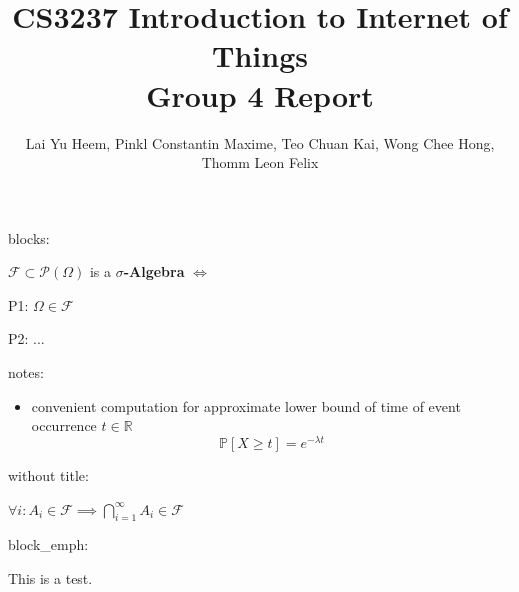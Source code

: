 \documentclass{article}
\begin{document}


blocks:

\begin{_block}

$\mathcal{F}\subset\mathcal{P}(\Omega)$ is a \textbf{$\sigma$-Algebra}
$\iff$

P1: $\Omega\in\mathcal{F}$

P2: ...

\end{_block}

notes:

\begin{_note}[Properties]
\begin{itemize}
\item convenient computation for approximate lower bound of time of event occurrence $t\in\mathbb{R}$
\[
\mathbb{P}[X\geq t]=e^{-\lambda t}
\]
\end{itemize}
\end{_note}

without title:

\begin{_note}[]

$\forall i:A_{i}\in\mathcal{F}\implies\bigcap_{i=1}^{\infty}A_{i}\in\mathcal{F}$

\end{_note}

block\_emph:

\begin{_block_emph}
This is a test.
\end{_block_emph}

\title{CS3237 Introduction to Internet of Things \\ Group 4 Report}
\author{Lai Yu Heem, Pinkl Constantin Maxime, Teo Chuan Kai, Wong Chee Hong, Thomm Leon Felix}
\maketitle

\renewcommand\thesection{\arabic{section}}
\renewcommand\thesubsection{\thesection.\alph{subsection}}
\end{document}
